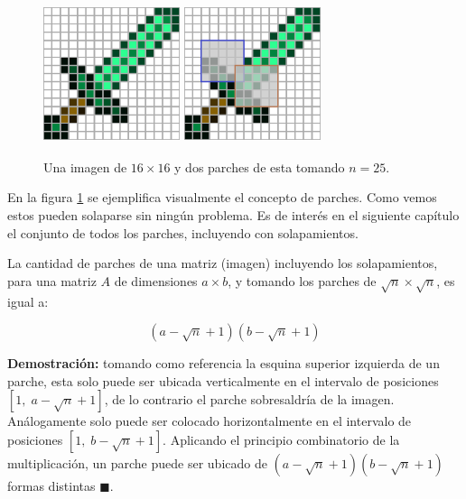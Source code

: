 \begin{figure}[h]
	\centering
	\includegraphics[width=4cm, height=4cm]{Graphics/diamon_sword.png}
	\hspace{1cm}
	\includegraphics[width=4cm, height=4cm]{Graphics/diamon_sword_with_patches.png}
	\caption{Una imagen de $16 \times 16$ y dos parches de esta tomando $n = 25$.}
	\label{ex:patches}
\end{figure}

En la figura \ref{ex:patches} se ejemplifica visualmente el concepto de parches. Como vemos estos pueden solaparse sin ning\'un problema. Es de inter\'es en el siguiente cap\'itulo el conjunto de todos los parches, incluyendo con solapamientos.

\begin{lemma}\label{le:count_patches}
	La cantidad de parches de una matriz (imagen) incluyendo los solapamientos, para una matriz $A$ de dimensiones $a \times b$, y tomando los parches de $\sqrt{n} \times \sqrt{n}$, es igual a:
	
	\begin{equation}
		(a - \sqrt{n} + 1)(b - \sqrt{n} + 1)
		\label{eq:count_patches}
	\end{equation}
\end{lemma}


\textbf{Demostraci\'on:} tomando como referencia la esquina superior izquierda de un parche, esta solo puede ser ubicada verticalmente en el intervalo de posiciones \\$[1,\; a - \sqrt{n} + 1]$, de lo contrario el parche sobresaldr\'ia de la imagen. An\'alogamente solo puede ser colocado horizontalmente en el intervalo de posiciones $[1,\; b - \sqrt{n} + 1]$. Aplicando el principio combinatorio de la multiplicaci\'on, un parche puede ser ubicado de $(a - \sqrt{n} + 1)(b - \sqrt{n} + 1)$ formas distintas $\blacksquare$.


